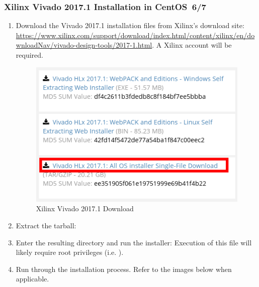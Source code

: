\begin{flushleft}
\begin{flushleft}
\subsubsection{Xilinx Vivado 2017.1 Installation in CentOS~6/7}
\label{sec:viv}
\begin{enumerate}
\item Download the Vivado 2017.1 installation files from Xilinx's download site:
\url{https://www.xilinx.com/support/download/index.html/content/xilinx/en/downloadNav/vivado-design-tools/2017-1.html}. A Xilinx account will be required.
\begin{figure}[ht]
	\centerline{\includegraphics[scale=0.6]{figures/xilinx_vivado_2017_download}}
	\caption{Xilinx Vivado 2017.1 Download}
\end{figure}
\item Extract the tarball:\newline
{}
\item Enter the resulting directory and run the installer:\newline
{}\newline
{}\newline
Execution of this file will likely require root privileges (i.e. ).
\pagebreak
\item Run through the installation process. Refer to the images below when applicable.
\begin{figure}[H]

\end{figure}
\end{enumerate}
\end{flushleft}
\end{flushleft}
